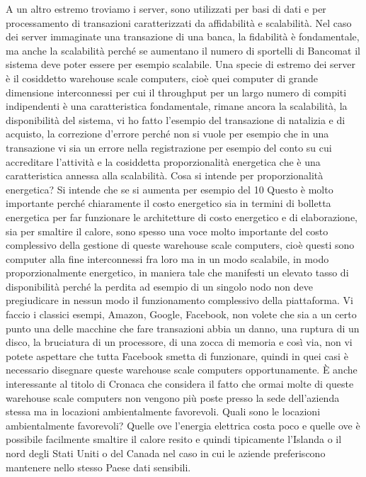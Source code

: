 A un altro estremo troviamo i server, sono utilizzati per basi di dati e per processamento di transazioni caratterizzati da affidabilità e scalabilità.
Nel caso dei server immaginate una transazione di una banca, la fidabilità è fondamentale, ma anche la scalabilità perché se aumentano il numero di sportelli di Bancomat il sistema deve poter essere per esempio scalabile.
Una specie di estremo dei server è il cosiddetto warehouse scale computers, cioè quei computer di grande dimensione interconnessi per cui il throughput per un largo numero di compiti indipendenti è una caratteristica fondamentale, rimane ancora la scalabilità, la disponibilità del sistema, vi ho fatto l'esempio del transazione di natalizia e di acquisto, la correzione d'errore perché non si vuole per esempio che in una transazione vi sia un errore nella registrazione per esempio del conto su cui accreditare l'attività e la cosiddetta proporzionalità energetica che è una caratteristica annessa alla scalabilità.
Cosa si intende per proporzionalità energetica?
Si intende che se si aumenta per esempio del 10%
Questo è molto importante perché chiaramente il costo energetico sia in termini di bolletta energetica per far funzionare le architetture di costo energetico e di elaborazione, sia per smaltire il calore, sono spesso una voce molto importante del costo complessivo della gestione di queste warehouse scale computers, cioè questi sono computer alla fine interconnessi fra loro ma in un modo scalabile, in modo proporzionalmente energetico, in maniera tale che manifesti un elevato tasso di disponibilità perché la perdita ad esempio di un singolo nodo non deve pregiudicare in nessun modo il funzionamento complessivo della piattaforma.
Vi faccio i classici esempi, Amazon, Google, Facebook, non volete che sia a un certo punto una delle macchine che fare transazioni abbia un danno, una ruptura di un disco, la bruciatura di un processore, di una zocca di memoria e così via, non vi potete aspettare che tutta Facebook smetta di funzionare, quindi in quei casi è necessario disegnare queste warehouse scale computers opportunamente.
È anche interessante al titolo di Cronaca che considera il fatto che ormai molte di queste warehouse scale computers non vengono più poste presso la sede dell'azienda stessa ma in locazioni ambientalmente favorevoli.
Quali sono le locazioni ambientalmente favorevoli?
Quelle ove l'energia elettrica costa poco e quelle ove è possibile facilmente smaltire il calore resito e quindi tipicamente l'Islanda o il nord degli Stati Uniti o del Canada nel caso in cui le aziende preferiscono mantenere nello stesso Paese dati sensibili.
